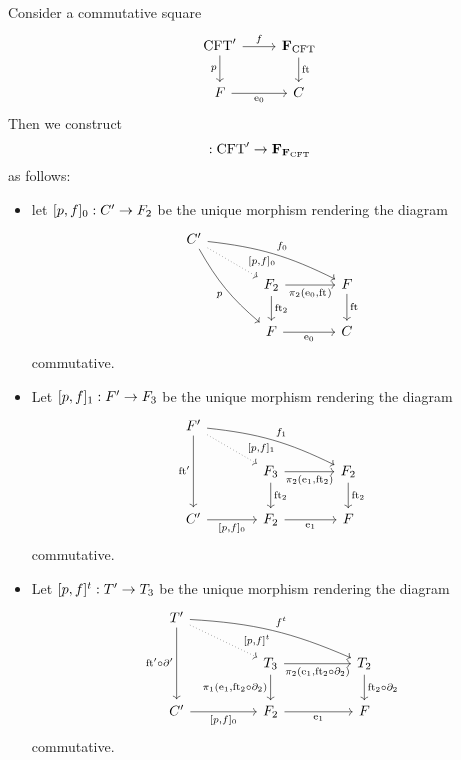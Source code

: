 \begin{defn}\label{famfamstesys_into}
Consider a commutative square
\begin{equation*}
\begin{tikzcd}
\stesys'
  \ar{r}{f}
  \ar{d}[swap]{p}
  &
\famesys\stesys
  \ar{d}{\eft}
  \\
\stesysf \ar{r}[swap]{\ectxext}
  &
\stesysc
\end{tikzcd}
\end{equation*}
Then we construct
\begin{equation*}
[p,f]:\stesys'\to\famesys{\famesys{\stesys}}
\end{equation*}
as follows:
\begin{itemize}
\item let $[p,f]_0:C'\to F_2$ be the unique morphism rendering
the diagram
\begin{equation*}
\begin{tikzcd}[column sep=large]
\stesysc' 
  \ar[bend left=10]{rrd}{f_0}
  \ar[swap,bend right=10]{ddr}{p}
  \ar[dotted]{dr}[near end]{[p,f]_0}
  \\
  {}&
\stesysf_2
  \ar{r}[swap]{\pullbackpr{2}{\ectxext}{\eft}}
  \ar{d}{\eft[2]}
  &
\stesysf
  \ar{d}{\eft}
  \\
  {}&
\stesysf
  \ar{r}[swap]{\ectxext}
  &
\stesysc
\end{tikzcd}
\end{equation*}
commutative.
\item Let $[p,f]_1:F'\to F_3$ be the unique morphism rendering
the diagram
\begin{equation*}
\begin{tikzcd}[column sep=large]
\stesysf'
  \ar[bend left=10]{drr}{f_1}
  \ar[swap]{dd}{\eft'}
  \ar[dotted]{dr}[near end]{[p,f]_1}
  \\
  {}&
\stesysf_3
  \ar{r}[swap]{\pullbackpr{2}{\efamext}{\eft[2]}}
  \ar{d}{\eft[2]}
  &
\stesysf_2
  \ar{d}{\eft[2]}
  \\
\stesysc'
  \ar{r}[swap]{[p,f]_0}
  &
\stesysf_2
  \ar{r}[swap]{\efamext}
  &
\stesysf
\end{tikzcd}
\end{equation*}
commutative.
\item Let $[p,f]^t:T'\to T_3$ be the unique morphism rendering
the diagram
\begin{equation*}
\begin{tikzcd}[column sep=huge]
\stesyst'
  \ar[bend left=10]{drr}{f^t}
  \ar[swap]{dd}{\eft'\circ\ebd'}
  \ar[dotted]{dr}[near end]{[p,f]^t}
  \\
  {}&
\stesyst_3
  \ar{r}[swap]{\pullbackpr{2}{\efamext}{\eft[2]\circ\ebd[2]}}
  \ar{d}[swap]{\pullbackpr{1}{\efamext}{\eft[2]\circ\ebd[2]}}
  &
\stesyst_2
  \ar{d}{\eft[2]\circ\ebd[2]}
  \\
\stesysc'
  \ar{r}[swap]{[p,f]_0}
  &
\stesysf_2
  \ar{r}[swap]{\efamext}
  &
\stesysf
\end{tikzcd}
\end{equation*}
commutative.
\end{itemize}
\end{defn}

